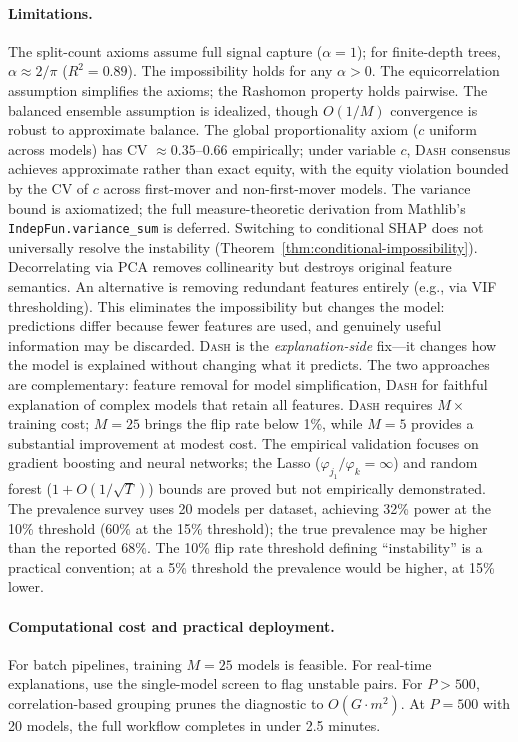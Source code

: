 \documentclass{article}
\newcommand{\DASH}{\textsc{Dash}}
\begin{document}
\paragraph{Limitations.}
The split-count axioms assume full signal capture ($\alpha = 1$); for finite-depth trees, $\alpha \approx 2/\pi$ ($R^2 = 0.89$). The impossibility holds for any $\alpha > 0$.
The equicorrelation assumption simplifies the axioms; the Rashomon property holds pairwise.
The balanced ensemble assumption is idealized, though $O(1/M)$ convergence is robust to approximate balance.
The global proportionality axiom ($c$ uniform across models) has CV $\approx 0.35$--$0.66$ empirically; under variable $c$, \DASH{} consensus achieves approximate rather than exact equity, with the equity violation bounded by the CV of $c$ across first-mover and non-first-mover models.
The variance bound is axiomatized; the full measure-theoretic derivation from Mathlib's \texttt{IndepFun.variance\_sum} is deferred.
Switching to conditional SHAP does not universally resolve the instability (Theorem~\ref{thm:conditional-impossibility}).
Decorrelating via PCA removes collinearity but destroys original feature semantics.
An alternative is removing redundant features entirely (e.g., via VIF thresholding). This eliminates the impossibility but changes the model: predictions differ because fewer features are used, and genuinely useful information may be discarded. \DASH{} is the \emph{explanation-side} fix---it changes how the model is explained without changing what it predicts. The two approaches are complementary: feature removal for model simplification, \DASH{} for faithful explanation of complex models that retain all features.
\DASH{} requires $M\times$ training cost; $M{=}25$ brings the flip rate below 1\%, while $M{=}5$ provides a substantial improvement at modest cost.
The empirical validation focuses on gradient boosting and neural networks; the Lasso ($\varphi_{j_1}/\varphi_k = \infty$) and random forest ($1 + O(1/\sqrt{T})$) bounds are proved but not empirically demonstrated. The prevalence survey uses 20 models per dataset, achieving 32\% power at the 10\% threshold (60\% at the 15\% threshold); the true prevalence may be higher than the reported 68\%.
The 10\% flip rate threshold defining ``instability'' is a practical convention; at a 5\% threshold the prevalence would be higher, at 15\% lower.

\paragraph{Computational cost and practical deployment.}
For batch pipelines, training $M{=}25$ models is feasible. For real-time explanations, use the single-model screen to flag unstable pairs. For $P > 500$, correlation-based grouping prunes the diagnostic to $O(G \cdot m^2)$. At $P{=}500$ with 20 models, the full workflow completes in under 2.5 minutes.
\end{document}
